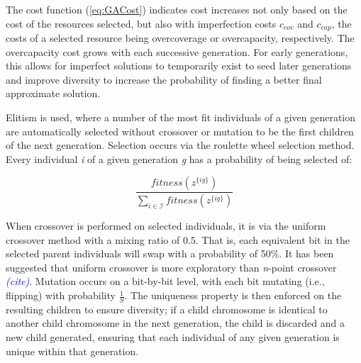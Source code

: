 \documentclass[onecolumn,draftcls]{IEEEtran}
\begin{document}

The cost function (\ref{eq:GACost}) indicates cost increases not only based on the cost of the resources selected, but also with imperfection costs $c_{cov}$ and $c_{cap}$, the costs of a selected resource being overcoverage or overcapacity, respectively.  The overcapacity cost grows with each successive generation.  For early generations, this allows for imperfect solutions to temporarily exist to seed later generations and improve diversity to increase the probability of finding a better final approximate solution.  %

Elitism is used, where a number of the most fit individuals of a given generation are automatically selected without crossover or mutation to be the first children of the next generation.  Selection occurs via the roulette wheel selection method.  Every individual \textit{i} of a given generation \textit{g} has a probability of being selected of:


\[
\frac{fitness\left( z^{\{ig\}} \right)}{\sum_{i \in \mathcal{I}} fitness\left( z^{\{ig\}} \right)}
\]

When crossover is performed on selected individuals, it is via the uniform crossover method with a mixing ratio of 0.5.  That is, each equivalent bit in the selected parent individuals will swap with a probability of 50\%.  It has been suggested that uniform crossover is more exploratory than \textit{n}-point crossover \textcolor{blue}{\textit{(cite)}}.  Mutation occurs on a bit-by-bit level, with each bit mutating (i.e., flipping) with probability $\frac{1}{S}$.  The uniqueness property is then enforced on the resulting children to ensure diversity; if a child chromosome is identical to another child chromosome in the next generation, the child is discarded and a new child generated, ensuring that each individual of any given generation is unique within that generation.

\end{document}
